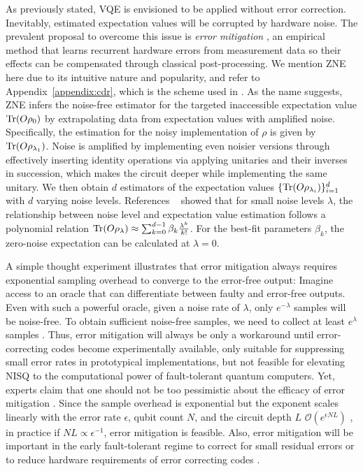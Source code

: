 \documentclass[../main.tex]{subfiles}
\begin{document}
As previously stated, \ac{VQE} is envisioned to be applied without error correction. Inevitably, estimated expectation values will be corrupted by hardware noise. The prevalent proposal to overcome this issue is \textit{error mitigation} \cite{cai2023quantum}, an empirical method that learns recurrent hardware errors from measurement data so their effects can be compensated through classical post-processing. We mention \ac{ZNE} here due to its intuitive nature and popularity, and refer to Appendix~\ref{appendix:cdr}, which is the scheme used in \cite{schroeder2024deterministic}. 
As the name suggests, \ac{ZNE} infers the noise-free estimator for the targeted inaccessible expectation value $\Tr(O \rho_0)$ by extrapolating data from expectation values with amplified noise. Specifically, the estimation for the noisy implementation of $\rho$ is given by $\Tr(O \rho_{\lambda_1})$. Noise is amplified by implementing even noisier versions through effectively inserting identity operations via applying unitaries and their inverses in succession, which makes the circuit deeper while implementing the same unitary. We then obtain $d$ estimators of the expectation values $\{ \Tr(O \rho_{\lambda_i}) \}_{i=1}^d$ with $d$ varying noise levels. References ~\cite{temme2017error, cai2023quantum}  showed that for small noise levels $\lambda$, the relationship between noise level and expectation value estimation follows a polynomial relation $\Tr (O \rho_\lambda) \approx \sum_{k = 0}^{d-1} \beta_k \frac{\lambda^k}{k!}$.  For the best-fit parameters $\beta_k$, the zero-noise expectation can be calculated at  $\lambda = 0$. 

A simple thought experiment illustrates that error mitigation always requires exponential sampling overhead to converge to the error-free output: Imagine access to an oracle that can differentiate between faulty and error-free outputs. Even with such a powerful oracle, given a noise rate of $\lambda$, only $e^{-\lambda}$ samples will be noise-free. To obtain sufficient noise-free samples, we need to collect at least $e^\lambda$ samples \cite{cai2023quantum}. Thus, error mitigation will always be only a workaround until error-correcting codes become experimentally available, only suitable for suppressing small error rates in prototypical implementations, but not feasible for elevating NISQ to the computational power of fault-tolerant quantum computers. Yet, experts claim that one should not be too pessimistic about the efficacy of error mitigation \cite{zimboras2025myths}. Since the sample overhead is exponential but the exponent scales linearly with the error rate $\epsilon$, qubit count $N$, and the circuit depth $L$ $\mathcal{O}(e^{\epsilon N L})$ \cite{tsubouchi2023universal}, in practice if $NL \propto \epsilon^{-1}$, error mitigation is feasible. Also, error mitigation will be important in the early fault-tolerant regime to correct for small residual errors \cite{dutkiewicz2024error} or to reduce hardware requirements of error correcting codes \cite{suzuki2022quantum}.
\end{document}
